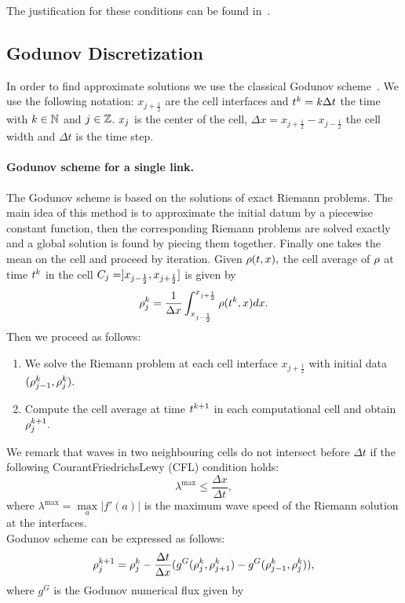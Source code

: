 The justification for these conditions can be found in~\cite{garavello2006traffic}.


\subsection{Godunov Discretization\label{sub:Godunov-Discretization}}

In order to find approximate solutions we use the classical Godunov scheme~\cite{godunov1959}. We use the following notation: $x_{j+\frac{1}{2}}$ are the cell interfaces and   $t^{k}=k\Delta t$ the time with $k\in\mathbb{N}$ and $j\in\mathbb{Z}$. $x_{j}$ is the center of the cell, $\Delta x=x_{j+\frac{1}{2}}-x_{j-\frac{1}{2}}$ the cell width and $\Delta t$ is the time step. 
\paragraph{Godunov scheme for a single link.}

The Godunov scheme is based on the solutions of exact Riemann problems. The main idea of this method is to approximate the initial datum by a piecewise constant function, then the corresponding Riemann problems are solved exactly and a global solution is found by piecing them together. Finally one takes the mean on the cell and proceed by iteration. Given $\rho(t,x),$ the cell average of $\rho$ at time $t^{k}$ in the cell $C_{j}=]x_{j-\frac{1}{2}},x_{j+\frac{1}{2}}]$ is given by 
\begin{equation}
\rho_{j}^{k}=\dfrac{1}{\Delta x}\int_{x_{j-\frac{1}{2}}}^{x_{j+\frac{1}{2}}}\rho(t^{k},x)dx.\label{eq:godproj}
\end{equation}
Then we proceed as follows:
\begin{enumerate}
	\item We solve the Riemann problem at each cell interface $x_{j+\frac{1}{2}}$ with initial data $(\rho^{k}_{j-1},\rho^{k}_{j}).$
	\item Compute the cell average at time $t^{k +1}$ in each computational cell and obtain $\rho^{k +1}_{j}.$ 
\end{enumerate}

We remark that waves in two neighbouring cells do not intersect before $\Delta t$ if the following Courant\textendash{}Friedrichs\textendash{}Lewy (CFL) condition holds:
\begin{equation}\label{eq:CFL}
\lambda^{\max}\le\frac{\Delta x}{\Delta t},
\end{equation}
where $\lambda^{\max}=\underset{a}{\max}|f'\left(a\right)|$ is the maximum wave speed of the Riemann solution at the interfaces.\\
Godunov scheme can be expressed as follows:
\begin{equation}
\rho_{j}^{k+1}=\rho_{j}^{k}-\frac{\Delta t}{\Delta x}(g^{G}(\rho_{j}^{k},\rho_{j+1}^{k})-g^{G}(\rho_{j-1}^{k},\rho_{j}^{k})),\label{eq:godscheme}
\end{equation}
where $g^{G}$ is the Godunov numerical flux given by

